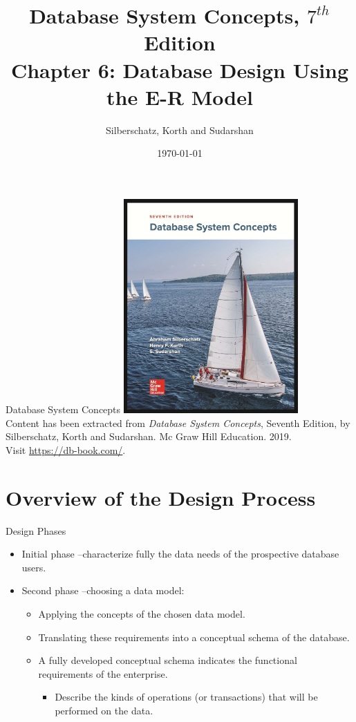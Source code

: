 \documentclass{beamer}
\title[Chapter 6]{Database System Concepts, $7^{th}$ Edition \\ Chapter 6: Database Design Using the E-R Model}
\author{Silberschatz, Korth and Sudarshan}
\date{\today}
\begin{document}
\frame{\titlepage}

\begin{frame}{Database System Concepts}
    \centering
    \includegraphics[width=0.5\textwidth]{figures/book_cover.jpg} \\
    \vspace{5mm}
    {
        \tiny
        Content has been extracted from \textit{Database System Concepts}, Seventh Edition, by Silberschatz, Korth and Sudarshan. Mc Graw Hill Education. 2019.\\
        Visit \url{https://db-book.com/}.\\
    }
\end{frame}

\section{Overview of the Design Process}

\begin{frame}{Design Phases}
    \begin{itemize}
        \item Initial phase --characterize fully the data needs of the prospective database users.
        \item Second phase --choosing a data model:
        \begin{itemize}
            \item Applying the concepts of the chosen data model.
            \item Translating these requirements into a conceptual schema of the database.
            \item A fully developed conceptual schema indicates the functional requirements of the enterprise.
            \begin{itemize}
                \item Describe the kinds of operations (or transactions) that will be performed on the data.
            \end{itemize}
        \end{itemize}
    \end{itemize}
\end{frame}
\end{document}
